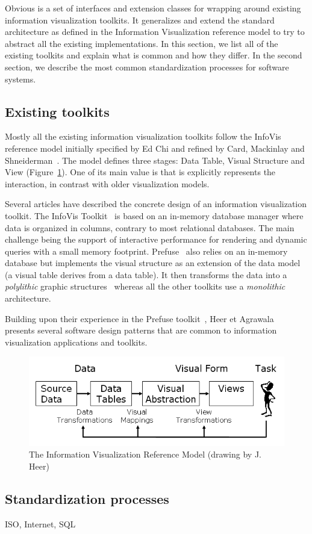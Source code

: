 Obvious is a set of interfaces and extension classes for wrapping
around existing information visualization toolkits.  It generalizes
and extend the standard architecture as defined in the Information
Visualization reference model to try to abstract all the existing
implementations.  In this section, we list all of the existing
toolkits and explain what is common and how they differ.  In the
second section, we describe the most common standardization processes
for software systems.

\subsection{Existing toolkits}

Mostly all the existing information visualization toolkits follow the
InfoVis reference model initially specified by Ed Chi and refined by
Card, Mackinlay and Shneiderman~\cite{ChiRefModel,ReadingsIV}.  The
model defines three stages: Data Table, Visual Structure and View
(Figure~\ref{fig:refmodel}).  One of its main value is that is
explicitly represents the interaction, in contrast with older
visualization models.

Several articles have described the concrete design of an information
visualization toolkit.  The InfoVis Toolkit~\cite{InfoVis} is based on
an in-memory database manager where data is organized in columns,
contrary to most relational databases.  The main challenge being the
support of interactive performance for rendering and dynamic queries
with a small memory footprint.  Prefuse~\cite{Prefuse} also relies on
an in-memory database but implements the visual structure as an
extension of the data model (a visual table derives from a data
table).  It then transforms the data into a \emph{polylithic} graphic
structures~\cite{Polylithic} whereas all the other toolkits use a
\emph{monolithic} architecture.


Building upon their experience in the
Prefuse toolkit~\cite{Prefuse}, Heer et Agrawala~\cite{DesignPatternsIV}
presents several software design patterns that are common to
information visualization applications and toolkits.

\begin{figure}
\includegraphics[width=\columnwidth]{figures/reference_model}
\caption{The Information Visualization Reference Model (drawing by
  J. Heer)}
\label{fig:refmodel}
\end{figure}

\cite{DesignPatternsIV}

\subsection{Standardization processes}
ISO, Internet, SQL





